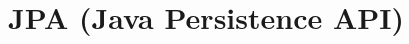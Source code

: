 \chapter{JPA (Java Persistence API)}
\label{JPA}
\thispagestyle{chapternohead}

	
\pagestyle{ruledfilip}















